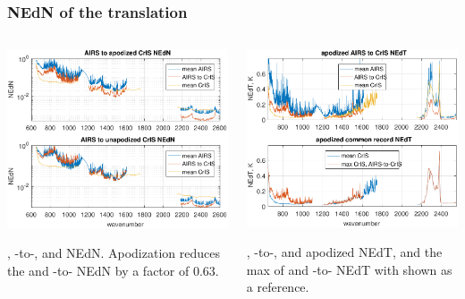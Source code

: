 \documentclass[10pt]{beamer}
\begin{document}
\begin{frame}
\frametitle{NEdN of the translation}
\begin{columns}[t]
\begin{column}{0.5\textwidth}  
  \begin{centering}
  \includegraphics[width=\textwidth]{figures/a2cris_nedn.pdf}
  \end{centering}\vspace{4mm}
  {\airs}, {\airs}-to-{\cris}, and {\cris} NEdN.  Apodization
  reduces the {\cris} and {\airs}-to-{\cris} NEdN by a factor of
  $0.63$.

\end{column}
\begin{column}{0.5\textwidth}
  \begin{centering}
  \includegraphics[width=\textwidth]{figures/a2cris_nedt.pdf}
  \end{centering}\vspace{3mm}
  {\airs}, {\airs}-to-{\cris}, and {\cris} apodized NEdT, and the
  max of {\cris} and {\airs}-to-{\cris} NEdT with {\cris} shown as
  a reference.
 

\end{column}
\end{columns}
\end{frame}
\end{document}
